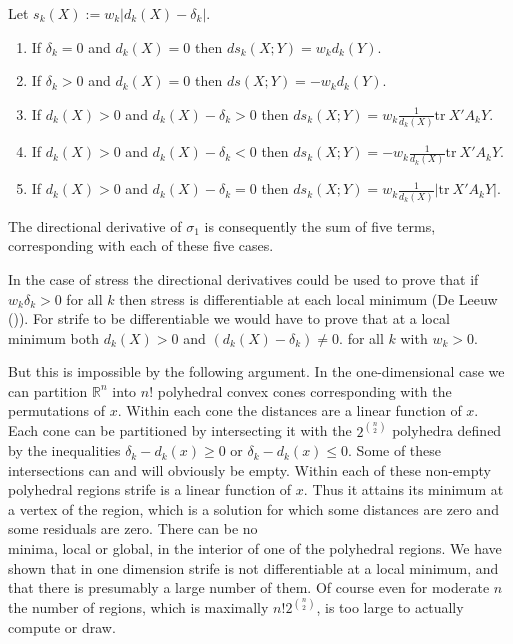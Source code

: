 \documentclass[
  12pt,
  letterpaper,
  DIV=11,
  numbers=noendperiod]{scrartcl}
\providecommand{\tightlist}{%
  \setlength{\itemsep}{0pt}\setlength{\parskip}{0pt}}\usepackage{longtable,booktabs,array}
\begin{document}
Let \(s_k(X):=w_k|d_k(X)-\delta_k|\).

\begin{enumerate}
\def\labelenumi{\arabic{enumi}.}
\tightlist
\item
  If \(\delta_k=0\) and \(d_k(X)=0\) then \(ds_k(X;Y)=w_kd_k(Y)\).
\item
  If \(\delta_k>0\) and \(d_k(X)=0\) then \(ds(X;Y)=-w_kd_k(Y)\).
\item
  If \(d_k(X)>0\) and \(d_k(X)-\delta_k>0\) then
  \(ds_k(X;Y)=w_k\frac{1}{d_k(X)}\text{tr}\ X'A_kY\).
\item
  If \(d_k(X)>0\) and \(d_k(X)-\delta_k<0\) then
  \(ds_k(X;Y)=-w_k\frac{1}{d_k(X)}\text{tr}\ X'A_kY\).
\item
  If \(d_k(X)>0\) and \(d_k(X)-\delta_k=0\) then
  \(ds_k(X;Y)=w_k\frac{1}{d_k(X)}|\text{tr}\ X'A_kY|\).
\end{enumerate}

The directional derivative of \(\sigma_1\) is consequently the sum of
five terms, corresponding with each of these five cases.

In the case of stress the directional derivatives could be used to prove
that if \(w_k\delta_k>0\) for all \(k\) then stress is differentiable at
each local minimum (De Leeuw ()). For
strife to be differentiable we would have to prove that at a local
minimum both \(d_k(X)>0\) and \((d_k(X)-\delta_k)\not= 0\). for all
\(k\) with \(w_k>0\).

But this is impossible by the following argument. In the one-dimensional
case we can partition \(\mathbb{R}^n\) into \(n!\) polyhedral convex
cones corresponding with the permutations of \(x\). Within each cone the
distances are a linear function of \(x\). Each cone can be partitioned
by intersecting it with the \(2^\binom{n}{2}\) polyhedra defined by the
inequalities \(\delta_k-d_k(x)\geq 0\) or \(\delta_k-d_k(x)\leq 0\).
Some of these intersections can and will obviously be empty. Within each
of these non-empty polyhedral regions strife is a linear function of
\(x\). Thus it attains its minimum at a vertex of the region, which is a
solution for which some distances are zero and some residuals are zero.
There can be no\\
minima, local or global, in the interior of one of the polyhedral
regions. We have shown that in one dimension strife is not
differentiable at a local minimum, and that there is presumably a large
number of them. Of course even for moderate \(n\) the number of regions,
which is maximally \(n!2^\binom{n}{2}\), is too large to actually
compute or draw.
\end{document}
